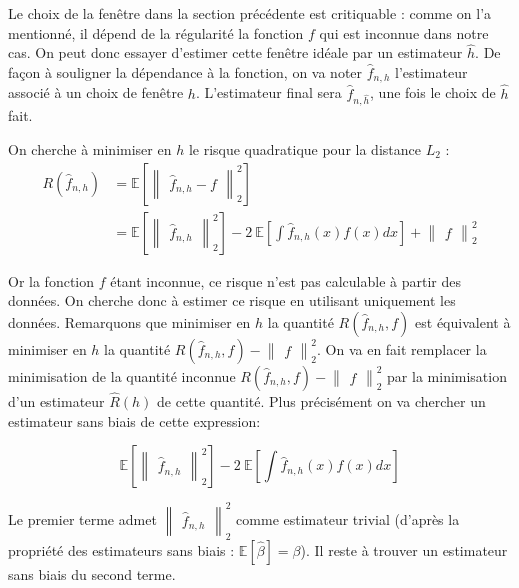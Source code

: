 \documentclass[
]{book}
\begin{document}
Le choix de la fenêtre dans la section précédente est critiquable : comme on l'a mentionné, il dépend de la régularité la fonction \(f\) qui est inconnue dans notre cas. On peut donc essayer d'estimer cette fenêtre idéale par un estimateur \(\hat{h}\). De façon à souligner la dépendance à la fonction, on va noter \(\hat{f}_{n,h}\) l'estimateur associé à un choix de fenêtre \(h\). L'estimateur final sera \(\hat{f}_{n,\hat{h}}\), une fois le choix de \(\hat{h}\) fait.\newline 

On cherche à minimiser en \(h\) le risque quadratique pour la distance \(L_2\) :
\[
\begin{aligned}
R(\hat {f}_{n,h})&=\mathbb{E}[\begin{Vmatrix}\hat {f}_{n,h}-f\end{Vmatrix}_2^2]\\        
&= \mathbb{E}[\begin{Vmatrix}\hat {f}_{n,h}\end{Vmatrix}_2^2] -2~\mathbb{E}[\int \hat {f}_{n,h}(x)f(x)dx] +\begin{Vmatrix}f\end{Vmatrix}_2^2
\end{aligned}
\]

Or la fonction \(f\) étant inconnue, ce risque n'est pas calculable à partir des données. On cherche donc à estimer ce risque en utilisant uniquement les données. Remarquons que minimiser en \(h\) la quantité \(R(\hat {f}_{n,h}, f)\) est équivalent à minimiser en \(h\) la quantité \(R(\hat {f}_{n,h}, f)-\begin{Vmatrix}f\end{Vmatrix}_2^2\). On va en fait remplacer la minimisation de la quantité inconnue \(R(\hat {f}_{n,h}, f)-\begin{Vmatrix}f\end{Vmatrix}_2^2\) par la minimisation d'un estimateur \(\hat {R}(h)\) de cette quantité. Plus précisément on va chercher un estimateur sans biais de cette expression:

\[
\mathbb{E}[\begin{Vmatrix}\hat {f}_{n,h}\end{Vmatrix}_2^2] -2~\mathbb{E}[\int \hat {f}_{n,h}(x)f(x)dx]
\]

Le premier terme admet \(\begin{Vmatrix}\hat {f}_{n,h}\end{Vmatrix}_2^2\) comme estimateur trivial (d'après la propriété des estimateurs sans biais : \(\mathbb{E}[\hat {\beta}]=\beta\)).\newline
Il reste à trouver un estimateur sans biais du second terme.
\end{document}
